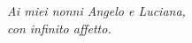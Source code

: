 
\vfil
\begin{flushright}
\textit{Ai miei nonni Angelo e Luciana, \\ con infinito affetto.}
\end{flushright}

